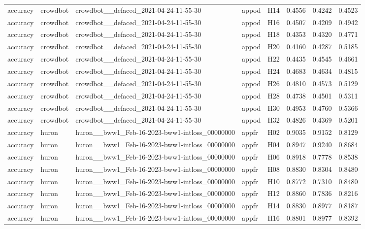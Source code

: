 \begin{table}[tbp]
\begin{tabular}{lllllrrr}
accuracy & crowdbot & crowdbot\_\_defaced\_2021-04-24-11-55-30 & appod & H14 & 0.4556 & 0.4242 & 0.4523 \\
accuracy & crowdbot & crowdbot\_\_defaced\_2021-04-24-11-55-30 & appod & H16 & 0.4507 & 0.4209 & 0.4942 \\
accuracy & crowdbot & crowdbot\_\_defaced\_2021-04-24-11-55-30 & appod & H18 & 0.4353 & 0.4320 & 0.4771 \\
accuracy & crowdbot & crowdbot\_\_defaced\_2021-04-24-11-55-30 & appod & H20 & 0.4160 & 0.4287 & 0.5185 \\
accuracy & crowdbot & crowdbot\_\_defaced\_2021-04-24-11-55-30 & appod & H22 & 0.4435 & 0.4545 & 0.4661 \\
accuracy & crowdbot & crowdbot\_\_defaced\_2021-04-24-11-55-30 & appod & H24 & 0.4683 & 0.4634 & 0.4815 \\
accuracy & crowdbot & crowdbot\_\_defaced\_2021-04-24-11-55-30 & appod & H26 & 0.4810 & 0.4573 & 0.5129 \\
accuracy & crowdbot & crowdbot\_\_defaced\_2021-04-24-11-55-30 & appod & H28 & 0.4738 & 0.4501 & 0.5311 \\
accuracy & crowdbot & crowdbot\_\_defaced\_2021-04-24-11-55-30 & appod & H30 & 0.4953 & 0.4760 & 0.5366 \\
accuracy & crowdbot & crowdbot\_\_defaced\_2021-04-24-11-55-30 & appod & H32 & 0.4826 & 0.4369 & 0.5201 \\
accuracy & huron & huron\_\_bww1\_Feb-16-2023-bww1-intloss\_00000000 & appfr & H02 & 0.9035 & 0.9152 & 0.8129 \\
accuracy & huron & huron\_\_bww1\_Feb-16-2023-bww1-intloss\_00000000 & appfr & H04 & 0.8947 & 0.9240 & 0.8684 \\
accuracy & huron & huron\_\_bww1\_Feb-16-2023-bww1-intloss\_00000000 & appfr & H06 & 0.8918 & 0.7778 & 0.8538 \\
accuracy & huron & huron\_\_bww1\_Feb-16-2023-bww1-intloss\_00000000 & appfr & H08 & 0.8830 & 0.8304 & 0.8480 \\
accuracy & huron & huron\_\_bww1\_Feb-16-2023-bww1-intloss\_00000000 & appfr & H10 & 0.8772 & 0.7310 & 0.8480 \\
accuracy & huron & huron\_\_bww1\_Feb-16-2023-bww1-intloss\_00000000 & appfr & H12 & 0.8860 & 0.7836 & 0.8216 \\
accuracy & huron & huron\_\_bww1\_Feb-16-2023-bww1-intloss\_00000000 & appfr & H14 & 0.8830 & 0.8977 & 0.8187 \\
accuracy & huron & huron\_\_bww1\_Feb-16-2023-bww1-intloss\_00000000 & appfr & H16 & 0.8801 & 0.8977 & 0.8392 \\

\end{tabular}
\end{table}
